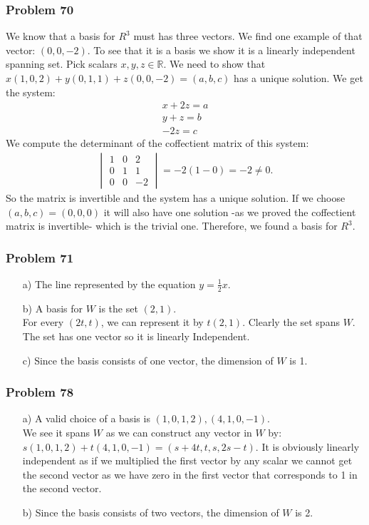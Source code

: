 \documentclass[a4paper,12pt]{article}
\begin{document}
\subsubsection*{Problem 70}
We know that a basis for $R^3$ must has three vectors. We find one example of that vector: $(0,0,-2)$. To see that it is a basis we show it is a linearly independent spanning set. Pick scalars $x,y,z \in \mathbb{R}.$ We need to show that $x(1,0,2)+y(0,1,1)+z(0,0,-2)=(a,b,c)$ has a unique solution.
We get the system:
\begin{align*}
    x+2z=a\\
    y+z=b\\
    -2z=c
\end{align*}
We compute the determinant of the coffectient matrix of this system:
\begin{align*}
    \begin{vmatrix}
        1&0&2\\
        0&1&1\\
        0&0&-2
    \end{vmatrix} = -2(1-0)=-2 \neq 0.
\end{align*}
So the matrix is invertible and the system has a unique solution. If we choose $(a,b,c)=(0,0,0)$ it will also have one solution -as we proved the coffectient matrix is invertible- which is the trivial one. Therefore, we found a basis for $R^3.$
\subsubsection*{Problem 71}
\begin{itemize}
    \item [a)] The line represented by the equation $y=\frac{1}{2}x.$
    \item [b)] A basis for $W$ is the set ${(2,1)}.$ \\ For every $(2t,t)$, we can represent it by $t(2,1).$ Clearly the set spans $W.$ The set has one vector so it is linearly Independent.
    
    \item [c)] Since the basis consists of one vector, the dimension of $W$ is 1.
\end{itemize}
\subsubsection*{Problem 78}
\begin{itemize}
    \item [a)] A valid choice of a basis is ${(1,0,1,2),(4,1,0,-1)}$. \\ We see it spans $W$ as we can construct any vector in $W$ by: $s(1,0,1,2)+t(4,1,0,-1)=(s+4t,t,s,2s-t).$ It is obviously linearly independent as if we multiplied the first vector by any scalar we cannot get the second vector as we have zero in the first vector that corresponds to 1 in the second vector.
    \item [b)] Since the basis consists of two vectors, the dimension of $W$ is 2.
\end{itemize}
\end{document}

